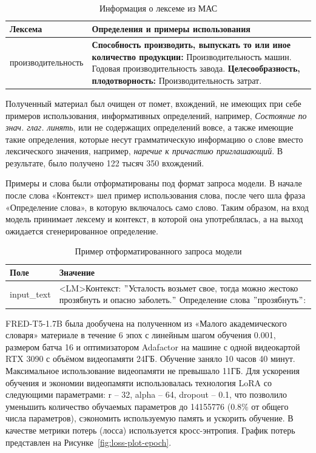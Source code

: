 \documentclass[LI,VKR]{HSEUniversity}
\begin{document}
\begin{table}[H]
\centering
\caption{Информация о лексеме из МАС} \\
\label{tab:Пример МАС}
\begin{tabular}{|m{4.5cm}|m{9.5cm}|}
\hline
\textbf{Лексема} & \textbf{Определения и примеры использования} \\
\hline
производительность & \textbf{Способность производить, выпускать то или иное количество продукции:} Производительность машин. Годовая производительность завода.
\newline \textbf{Целесообразность, плодотворность:} Производительность затрат. \\
\hline
\end{tabular}
\end{table}

Полученный материал был очищен от помет, вхождений, не имеющих при себе примеров использования,
информативных определений, например, \textit{Состояние по знач. глаг. линять},
или не содержащих определений вовсе, а также имеющие такие определения,
которые несут грамматическую информацию о слове вместо лексического значения,
например, \textit{наречие к причастию приглашающий}.
В результате, было получено 122 тысяч 350 вхождений.

Примеры и слова были отформатированы под формат запроса модели.
В начале после слова «Контекст» шел пример использования слова, после чего шла фраза
«Определение слова», в которую включалось само слово.
Таким образом, на вход модель
принимает лексему и контекст, в которой она употреблялась, а на выход ожидается сгенерированное
определение.

\begin{table}[H]
\centering
\caption{Пример отформатированного запроса модели}
\begin{tabular}{|m{2.5cm}|m{9.5cm}|}
\hline
\textbf{Поле}       & \textbf{Значение}                                                                                          \\
\hline
input\_text  & <LM>Контекст: \("\)Усталость возьмет свое, тогда можно жестоко прозябнуть и опасно заболеть.\("\) Определение слова \("\)прозябнуть\("\): \\
\hline
\end{tabular}
\end{table}

FRED-T5-1.7B была дообучена на полученном из «Малого академического словаря» материале
в течение 6 эпох с линейным шагом обучения 0.001,
размером батча 16 и оптимизатором Adafactor на машине с одной видеокартой RTX 3090
с объёмом видеопамяти 24ГБ.
Обучение заняло 10 часов 40 минут. %
Максимальное использование видеопамяти не превышало 11ГБ. %
Для ускорения обучения и экономии видеопамяти использовалась технология LoRA со
следующими параметрами: r – 32, alpha
 – 64, dropout – 0.1, что позволило
уменьшить количество обучаемых параметров до 14155776 (0.8\% от общего числа параметров),
сэкономить используемую память и ускорить обучение.
В качестве метрики потерь (лосса) используется кросс-энтропия.
График потерь представлен на Рисунке~\ref{fig:loss-plot-epoch}.
\end{document}
